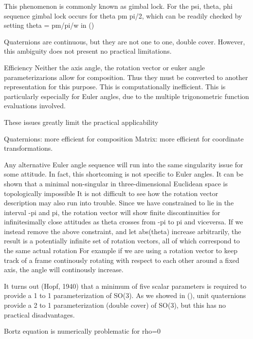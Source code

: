 This phenomenon is commonly known as gimbal lock. For the psi, theta, phi sequence gimbal lock occurs for theta pm pi/2, which can be readily checked by setting theta = pm/pi/w in ()

Quaternions are continuous, but they are not one to one, double cover. However, this ambiguity does not present no practical limitations.

Efficiency
Neither the axis angle, the rotation vector or euker angle parameterizarions allow for composition. Thus they must be converted to another representation for this purpose. This is computationally inefficient. This is particularly especially for Euler angles, due to the multiple trigonometric function evaluations involved.

These issues greatly limit the practical applicability

Quaternions: more efficient for composition
Matrix: more efficient for coordinate transformations.


Any alternative Euler angle sequence will run into the same singularity issue for some attitude. In fact, this shortcoming is not specific to Euler angles. It can be shown that a minimal non-singular in three-dimensional Euclidean space is topologically impossible
It is not difficult to see how the rotation vector description may also run into trouble. Since we have constrained to lie in the interval -pi and pi, the rotation vector will show finite discontinuities for infinitesimally close attitudes as theta crosses from -pi to pi and viceversa. If we instead remove the above constraint, and let abs(theta) increase arbitrarily, the result is a potentially infinite set of rotation vectors, all of which correspond to the same actual rotation
For example if we are using a rotation vector to keep track of a frame continously rotating with respect to each other around a fixed axis, the angle will continously increase.

It turns out (Hopf, 1940) that a minimum of five scalar parameters is required to provide a 1 to 1 parameterization of SO(3). As we showed in (), unit quaternions provide a 2 to 1 parameterization (double cover) of SO(3), but this has no practical disadvantages.

Bortz equation is numerically problematic for rho=0

\endinput